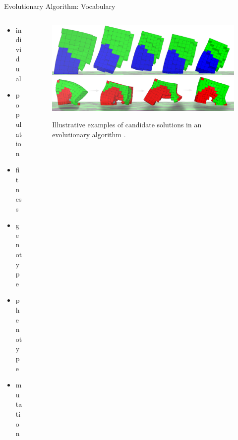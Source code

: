 \begin{frame}{Evolutionary Algorithm: Vocabulary}

\begin{columns}
\begin{column}{0.25\textwidth}
\begin{itemize}
  \item individual
  \item population
  \item fitness
  \item genotype
  \item phenotype
  \item mutation
\end{itemize}
\end{column}
\begin{column}{0.75\textwidth}
\begin{figure}
    \includegraphics[width=\textwidth]{img/jumpertimeseries3_orig} \\
  \vspace{1ex}
  \includegraphics[width=\textwidth]{img/runnershortarrow_orig}
  \captionsetup{singlelinecheck=off,justification=raggedright}
  \caption{Illustrative examples of candidate solutions in an evolutionary algorithm \cite[Figures 1, 12]{Cheney2013UnshacklingEncoding}.}
\end{figure}
\end{column}
\end{columns}
    
\end{frame}

